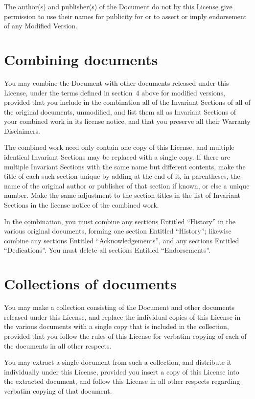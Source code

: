 The author(s) and publisher(s) of the Document do not by this License
give permission to use their names for publicity for or to assert or
imply endorsement of any Modified Version.


\section{Combining documents}

You may combine the Document with other documents released under this
License, under the terms defined in section~4 above for modified
versions, provided that you include in the combination all of the
Invariant Sections of all of the original documents, unmodified, and
list them all as Invariant Sections of your combined work in its
license notice, and that you preserve all their Warranty Disclaimers.

The combined work need only contain one copy of this License, and
multiple identical Invariant Sections may be replaced with a single
copy.  If there are multiple Invariant Sections with the same name but
different contents, make the title of each such section unique by
adding at the end of it, in parentheses, the name of the original
author or publisher of that section if known, or else a unique number.
Make the same adjustment to the section titles in the list of
Invariant Sections in the license notice of the combined work.

In the combination, you must combine any sections Entitled ``History''
in the various original documents, forming one section Entitled
``History''; likewise combine any sections Entitled ``Acknowledgements'',
and any sections Entitled ``Dedications''.  You must delete all sections
Entitled ``Endorsements''.


\section{Collections of documents}

You may make a collection consisting of the Document and other documents
released under this License, and replace the individual copies of this
License in the various documents with a single copy that is included in
the collection, provided that you follow the rules of this License for
verbatim copying of each of the documents in all other respects.

You may extract a single document from such a collection, and distribute
it individually under this License, provided you insert a copy of this
License into the extracted document, and follow this License in all
other respects regarding verbatim copying of that document.


